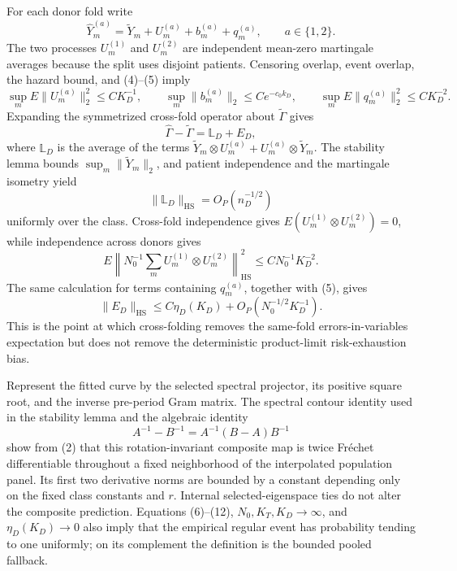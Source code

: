 For each donor fold write
\[
 \widehat Y_m^{(a)}=\widetilde Y_m+U_m^{(a)}+b_m^{(a)}+q_m^{(a)},
 \qquad a\in\{1,2\}.                                        \tag{7}
\]
The two processes \(U_m^{(1)}\) and \(U_m^{(2)}\) are independent mean-zero
martingale averages because the split uses disjoint patients.  Censoring
overlap, event overlap, the hazard bound, and (4)--(5) imply
\[
 \sup_m E\|U_m^{(a)}\|_2^2\le CK_D^{-1},
 \qquad
 \sup_m\|b_m^{(a)}\|_2\le Ce^{-c_0k_D},
 \qquad
 \sup_m E\|q_m^{(a)}\|_2^2\le CK_D^{-2}.                   \tag{8}
\]
Expanding the symmetrized cross-fold operator about
\(\widetilde\Gamma\) gives
\[
 \widehat\Gamma-\widetilde\Gamma=\mathbb L_D+E_D,          \tag{9}
\]
where \(\mathbb L_D\) is the average of the terms
\(\widetilde Y_m\otimes U_m^{(a)}+U_m^{(a)}\otimes
\widetilde Y_m\).  The stability lemma bounds
\(\sup_m\|\widetilde Y_m\|_2\), and patient independence and the martingale
isometry yield
\[
 \|\mathbb L_D\|_{\mathrm{HS}}=O_P(n_D^{-1/2})              \tag{10}
\]
uniformly over the class.  Cross-fold independence gives
\(E(U_m^{(1)}\otimes U_m^{(2)})=0\), while independence across donors gives
\[
 E\left\|N_0^{-1}\sum_mU_m^{(1)}\otimes U_m^{(2)}
   \right\|_{\mathrm{HS}}^2
 \le C N_0^{-1}K_D^{-2}.                                   \tag{11}
\]
The same calculation for terms containing \(q_m^{(a)}\), together with
(5), gives
\[
 \|E_D\|_{\mathrm{HS}}
 \le C\eta_D(K_D)+O_P(N_0^{-1/2}K_D^{-1}).                 \tag{12}
\]
This is the point at which cross-folding removes the same-fold
errors-in-variables expectation but does not remove the deterministic
product-limit risk-exhaustion bias.

Represent the fitted curve by the selected spectral projector, its positive
square root, and the inverse pre-period Gram matrix.  The spectral contour
identity used in the stability lemma and the algebraic identity
\[
 A^{-1}-B^{-1}=A^{-1}(B-A)B^{-1}                             \tag{13}
\]
show from (2) that this rotation-invariant composite map is twice
Fr\'echet differentiable throughout a fixed neighborhood of the
interpolated population panel.  Its first two derivative norms are bounded
by a constant depending only on the fixed class constants and \(r\).
Internal selected-eigenspace ties do not alter the composite prediction.
Equations (6)--(12), \(N_0,K_T,K_D\to\infty\), and
\(\eta_D(K_D)\to0\) also imply that the empirical regular event has
probability tending to one uniformly; on its complement the definition is
the bounded pooled fallback.

